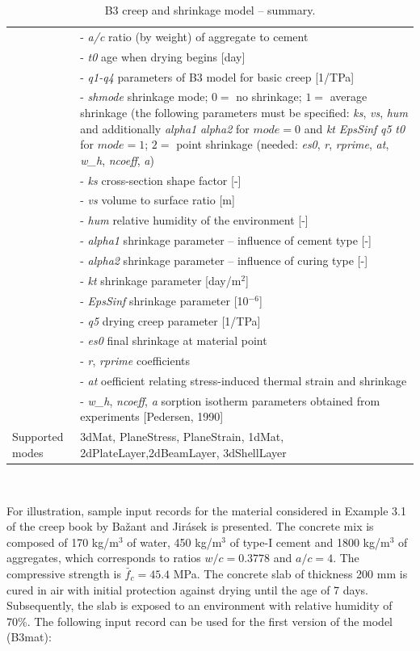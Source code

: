\documentclass[a4paper]{article}
\newcommand{\param}[1]{{\it #1}}
\newenvironment{mmt}{\begin{tabular}{|l|p{9cm}|}}{\end{tabular}\\}
\newenvironment{mmt}{\begin{tabular}{|l|l|}}{\end{tabular}\\}
\begin{document}
\begin{table}[!htb]
\begin{mmt}
&- \param{a/c} ratio (by weight) of aggregate to cement \\
&- \param{t0} age when drying begins [day]\\
&- \param{q1-q4} parameters of B3 model for basic creep [1/TPa]\\
%
&- \param{shmode} shrinkage mode;
$0=$ no shrinkage;
$1=$ average shrinkage (the following parameters must be specified:
\param{ks}, \param{vs}, \param{hum} and additionally  \param{alpha1} \param{alpha2} for $mode = 0$
and \param{kt} \param{EpsSinf} \param{q5} \param{t0} for $mode = 1$;  
$2=$ point shrinkage (needed: \param{es0}, \param{r}, \param{rprime},
\param{at}, \param{w\_h}, \param{ncoeff}, \param{a})\\
%
&- \param{ks} cross-section shape factor [-]\\
&- \param{vs} volume to surface ratio [m]\\
&- \param{hum} relative humidity of the environment [-]\\
&- \param{alpha1} shrinkage parameter -- influence of cement type [-]\\
&- \param{alpha2} shrinkage parameter -- influence of curing type [-]\\
&- \param{kt} shrinkage parameter [day/m$^2$]\\
&- \param{EpsSinf} shrinkage parameter [10$^{-6}$]\\
&- \param{q5} drying creep parameter [1/TPa]\\
%
&- \param{es0} final shrinkage at material point\\
&- \param{r}, \param{rprime} coefficients\\
&- \param{at} oefficient relating stress-induced thermal strain and shrinkage\\
&- \param{w\_h}, \param{ncoeff}, \param{a} sorption isotherm parameters obtained from experiments [Pedersen, 1990] \\
%
Supported modes& 3dMat, PlaneStress, PlaneStrain, 1dMat,
2dPlateLayer,2dBeamLayer, 3dShellLayer\\
\hline
\end{mmt}
\caption{B3 creep and shrinkage model -- summary.}
\label{b3_table}
\end{table}

For illustration, sample input records for the material considered in Example 3.1 of the creep
book by Ba\v{z}ant and Jir\'{a}sek is presented. The concrete mix is composed
of 170 kg/m$^3$ of water, 450 kg/m$^3$ of type-I cement and 1800 kg/m$^3$ of aggregates,
which corresponds to ratios $w/c=0.3778$ and $a/c=4$. The compressive strength 
is $\bar{f}_c=45.4$ MPa. The concrete slab of thickness 200 mm is cured in air
with initial protection against drying until the age of 7 days.
Subsequently, the slab is exposed to an environment with
relative humidity of 70\%. The following input record can be used for the first
version of the model (B3mat):
\end{document}
